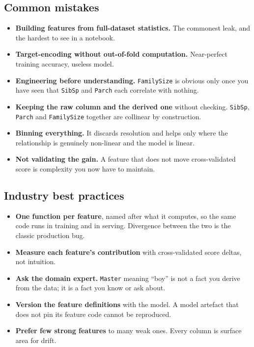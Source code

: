\documentclass[11pt,a4paper]{article}
\begin{document}
\subsection*{Common mistakes}

\begin{itemize}\itemsep3pt
  \item \textbf{Building features from full-dataset statistics.} The commonest leak, and
        the hardest to see in a notebook.
  \item \textbf{Target-encoding without out-of-fold computation.} Near-perfect training
        accuracy, useless model.
  \item \textbf{Engineering before understanding.} \texttt{FamilySize} is obvious only once
        you have seen that \texttt{SibSp} and \texttt{Parch} each correlate with nothing.
  \item \textbf{Keeping the raw column and the derived one} without checking. \texttt{SibSp},
        \texttt{Parch} and \texttt{FamilySize} together are collinear by construction.
  \item \textbf{Binning everything.} It discards resolution and helps only where the
        relationship is genuinely non-linear and the model is linear.
  \item \textbf{Not validating the gain.} A feature that does not move cross-validated score
        is complexity you now have to maintain.
\end{itemize}

\subsection*{Industry best practices}

\begin{itemize}\itemsep3pt
  \item \textbf{One function per feature}, named after what it computes, so the same code
        runs in training and in serving. Divergence between the two is the classic
        production bug.
  \item \textbf{Measure each feature's contribution} with cross-validated score deltas, not
        intuition.
  \item \textbf{Ask the domain expert.} \texttt{Master} meaning ``boy'' is not a fact you
        derive from the data; it is a fact you know or ask about.
  \item \textbf{Version the feature definitions} with the model. A model artefact that does
        not pin its feature code cannot be reproduced.
  \item \textbf{Prefer few strong features} to many weak ones. Every column is surface area
        for drift.
\end{itemize}
\end{document}
